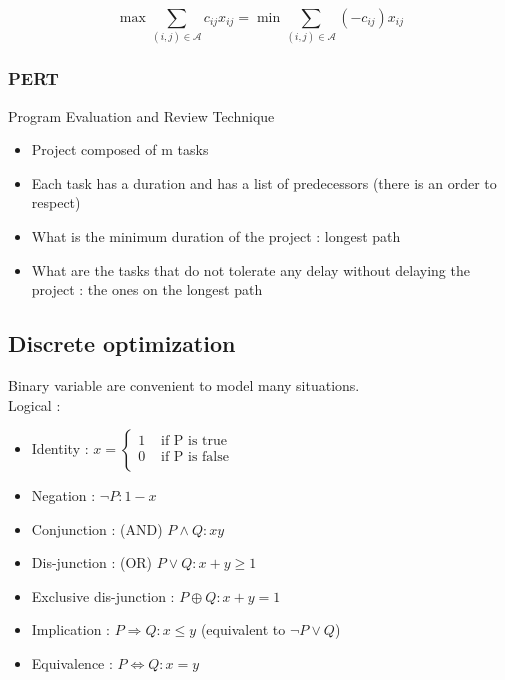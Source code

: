 \documentclass[../main.tex]{subfiles}
\begin{document}
\begin{equation}
    \max \sum_{(i,j)\in \mathcal{A}} c_{ij}x_{ij} = \min \sum_{(i,j)\in \mathcal{A}} (-c_{ij})x_{ij}
\end{equation}

\subsubsection{PERT}
Program Evaluation and Review Technique\\

\begin{itemize}
    \item Project composed of m tasks\\
    \item Each task has a duration and has a list of predecessors (there is an order to respect)\\
    \item What is the minimum duration of the project : longest path\\
    \item What are the tasks that do not tolerate any delay without delaying the project : the ones on the longest path\\
\end{itemize}

\subsection{Discrete optimization}

Binary variable are convenient to model many situations.\\

Logical : \begin{itemize}
    \item Identity : $x = \begin{cases}
        1 & \text{ if P is true}\\
        0 & \text{ if P is false}\\
    \end{cases}$\\
    \item Negation : $\neg P : 1-x$\\
    \item Conjunction : (AND) $P\wedge Q : xy$\\
    \item Dis-junction : (OR) $P\vee Q : x+y\geq 1$\\
    \item Exclusive dis-junction : $P \oplus Q : x+y=1$\\
    \item Implication : $P\Rightarrow Q : x\leq y$ (equivalent to $\neg P\vee Q$)\\
    \item Equivalence : $P\Leftrightarrow Q : x=y$\\
\end{itemize}
\end{document}
